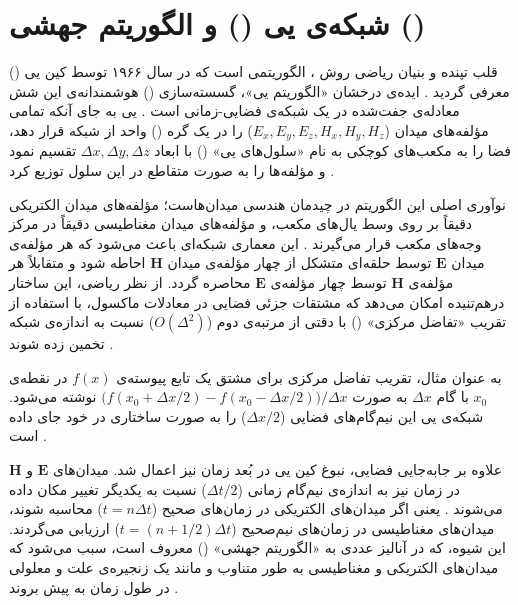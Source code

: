 \documentclass[12pt,a4paper]{report}
\begin{document}
\section{شبکه‌ی یی () و الگوریتم جهشی ()}
قلب تپنده و بنیان ریاضی روش ، الگوریتمی است که در سال ۱۹۶۶ توسط کین یی () معرفی گردید \cite{yee}. ایده‌ی درخشان «الگوریتم یی»، گسسته‌سازی () هوشمندانه‌ی این شش معادله‌ی جفت‌شده در یک شبکه‌ی فضایی-زمانی است \cite{yee,taflove}. یی به جای آنکه تمامی مؤلفه‌های میدان ($E_x,E_y,E_z,H_x,H_y,H_z$) را در یک گره () واحد از شبکه قرار دهد، فضا را به مکعب‌های کوچکی به نام «سلول‌های یی» () با ابعاد $\Delta x,\Delta y,\Delta z$ تقسیم نمود و مؤلفه‌ها را به صورت متقاطع در این سلول توزیع کرد \cite{yee}.

نوآوری اصلی این الگوریتم در چیدمان هندسی میدان‌هاست؛ مؤلفه‌های میدان الکتریکی دقیقاً بر روی وسط یال‌های مکعب، و مؤلفه‌های میدان مغناطیسی دقیقاً در مرکز وجه‌های مکعب قرار می‌گیرند \cite{yee,taflove}. این معماری شبکه‌ای باعث می‌شود که هر مؤلفه‌ی میدان $\mathbf{E}$ توسط حلقه‌ای متشکل از چهار مؤلفه‌ی میدان $\mathbf{H}$ احاطه شود و متقابلاً هر مؤلفه‌ی $\mathbf{H}$ توسط چهار مؤلفه‌ی $\mathbf{E}$ محاصره گردد. از نظر ریاضی، این ساختار درهم‌تنیده امکان می‌دهد که مشتقات جزئی فضایی در معادلات ماکسول، با استفاده از تقریب «تفاضل مرکزی» () با دقتی از مرتبه‌ی دوم ($O(\Delta^2)$) نسبت به اندازه‌ی شبکه تخمین زده شوند \cite{yee,taflove}.

به عنوان مثال، تقریب تفاضل مرکزی برای مشتق یک تابع پیوسته‌ی $f(x)$ در نقطه‌ی $x_0$ با گام $\Delta x$ به صورت $\big(f(x_0+\Delta x/2)-f(x_0-\Delta x/2)\big)/\Delta x$ نوشته می‌شود. شبکه‌ی یی این نیم‌گام‌های فضایی ($\Delta x/2$) را به صورت ساختاری در خود جای داده است \cite{yee}.

علاوه بر جابه‌جایی فضایی، نبوغ کین یی در بُعد زمان نیز اعمال شد. میدان‌های $\mathbf{E}$ و $\mathbf{H}$ در زمان نیز به اندازه‌ی نیم‌گام زمانی ($\Delta t/2$) نسبت به یکدیگر تغییر مکان داده می‌شوند \cite{yee,taflove}. یعنی اگر میدان‌های الکتریکی در زمان‌های صحیح ($t=n\Delta t$) محاسبه شوند، میدان‌های مغناطیسی در زمان‌های نیم‌صحیح ($t=(n+1/2)\Delta t$) ارزیابی می‌گردند. این شیوه، که در آنالیز عددی به «الگوریتم جهشی» () معروف است، سبب می‌شود که میدان‌های الکتریکی و مغناطیسی به طور متناوب و مانند یک زنجیره‌ی علت و معلولی در طول زمان به پیش بروند \cite{taflove}.
\end{document}
